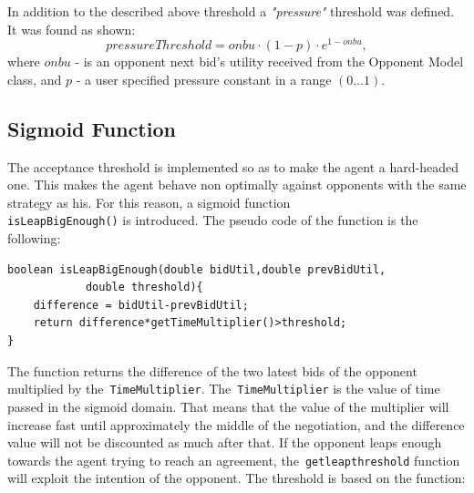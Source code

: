 \documentclass[html]{report}    %
\begin{document}
In addition to the described above threshold a \textit{"pressure"} threshold was defined. It was found as shown:
\begin{dmath} \label{7}	
	pressureThreshold = onbu\cdot(1 - p)\cdot e^{1 - onbu},
\end{dmath}
where $onbu$ - is an opponent next bid's utility received from the Opponent Model class, and $p$ - a user specified pressure constant in a range $(0\dots1)$.

\subsection{Sigmoid Function}
The acceptance threshold is implemented so as to make the agent a hard-headed one. This makes the agent behave non optimally against opponents with the same strategy as his. For this reason, a sigmoid function\\
\texttt{isLeapBigEnough()} is introduced. The pseudo code of the function is the following:
\begin{verbatim}
boolean isLeapBigEnough(double bidUtil,double prevBidUtil,
            double threshold){
    difference = bidUtil-prevBidUtil;
    return difference*getTimeMultiplier()>threshold;
}
\end{verbatim}
The function returns the difference of the two latest bids of the opponent multiplied by the~\texttt{TimeMultiplier}. The~\texttt{TimeMultiplier} is the value of time passed in the sigmoid domain. That means that the value of the multiplier will increase fast until approximately the middle of the negotiation, and the difference value will not be discounted as much after that. If the opponent leaps enough towards the agent trying to reach an agreement, the~\texttt{getleapthreshold} function will exploit the intention of the opponent. The threshold is based on the function: 
\end{document}
